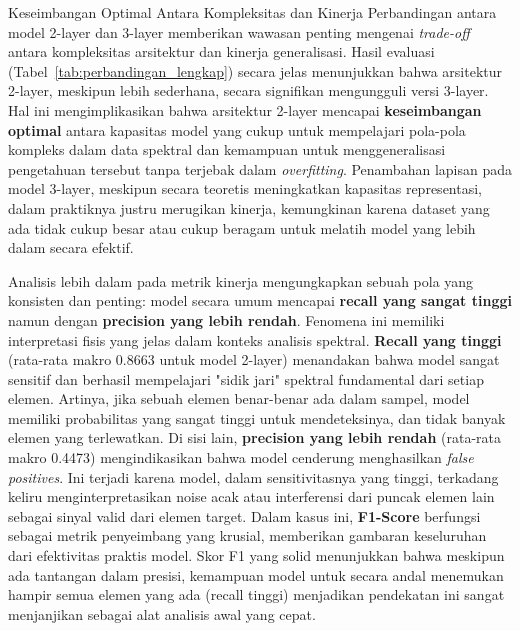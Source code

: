 \par Keseimbangan Optimal Antara Kompleksitas dan Kinerja Perbandingan antara model 2-layer dan 3-layer memberikan wawasan penting mengenai \textit{trade-off} antara kompleksitas arsitektur dan kinerja generalisasi. Hasil evaluasi (Tabel~\ref{tab:perbandingan_lengkap}) secara jelas menunjukkan bahwa arsitektur 2-layer, meskipun lebih sederhana, secara signifikan mengungguli versi 3-layer. Hal ini mengimplikasikan bahwa arsitektur 2-layer mencapai \textbf{keseimbangan optimal} antara kapasitas model yang cukup untuk mempelajari pola-pola kompleks dalam data spektral dan kemampuan untuk menggeneralisasi pengetahuan tersebut tanpa terjebak dalam \textit{overfitting}. Penambahan lapisan pada model 3-layer, meskipun secara teoretis meningkatkan kapasitas representasi, dalam praktiknya justru merugikan kinerja, kemungkinan karena dataset yang ada tidak cukup besar atau cukup beragam untuk melatih model yang lebih dalam secara efektif.

Analisis lebih dalam pada metrik kinerja mengungkapkan sebuah pola yang konsisten dan penting: model secara umum mencapai \textbf{recall yang sangat tinggi} namun dengan \textbf{precision yang lebih rendah}. Fenomena ini memiliki interpretasi fisis yang jelas dalam konteks analisis spektral. \textbf{Recall yang tinggi} (rata-rata makro 0.8663 untuk model 2-layer) menandakan bahwa model sangat sensitif dan berhasil mempelajari "sidik jari" spektral fundamental dari setiap elemen. Artinya, jika sebuah elemen benar-benar ada dalam sampel, model memiliki probabilitas yang sangat tinggi untuk mendeteksinya, dan tidak banyak elemen yang terlewatkan. Di sisi lain, \textbf{precision yang lebih rendah} (rata-rata makro 0.4473) mengindikasikan bahwa model cenderung menghasilkan \textit{false positives}. Ini terjadi karena model, dalam sensitivitasnya yang tinggi, terkadang keliru menginterpretasikan noise acak atau interferensi dari puncak elemen lain sebagai sinyal valid dari elemen target. Dalam kasus ini, \textbf{F1-Score} berfungsi sebagai metrik penyeimbang yang krusial, memberikan gambaran keseluruhan dari efektivitas praktis model. Skor F1 yang solid menunjukkan bahwa meskipun ada tantangan dalam presisi, kemampuan model untuk secara andal menemukan hampir semua elemen yang ada (recall tinggi) menjadikan pendekatan ini sangat menjanjikan sebagai alat analisis awal yang cepat.

